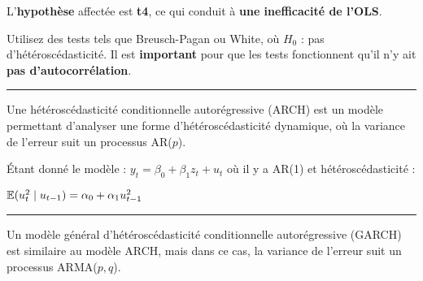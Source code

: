   \begin{f}

L'\textbf{hypothèse} affectée est \textbf{t4}, ce qui conduit à \textbf{une inefficacité de l'OLS}.

Utilisez des tests tels que Breusch-Pagan ou White, où \(H_{0}\) : pas d'hétéroscédasticité. Il est \textbf{important} pour que les tests fonctionnent qu'il n'y ait \textbf{pas d'autocorrélation}.

\end{f}  \hrule  
\begin{f}[ARCH]

Une hétéroscédasticité conditionnelle autorégressive (ARCH) est un modèle permettant d'analyser une forme d'hétéroscédasticité dynamique, où la variance de l'erreur suit un processus AR(\(p\)).

Étant donné le modèle : \(y_{t} = \beta_{0} + \beta_{1} z_{t} + u_{t}\) où il y a AR(1) et hétéroscédasticité :

\begin{center}
	\(\mathbb{E}(u^{2}_{t} \mid u_{t - 1}) = \alpha_{0} + \alpha_{1} u^{2}_{t - 1}\)
\end{center}

\end{f}  \hrule 
 \begin{f}[GARCH]

Un modèle général d'hétéroscédasticité conditionnelle autorégressive (GARCH) est similaire au modèle ARCH, mais dans ce cas, la variance de l'erreur suit un processus ARMA(\(p, q\)).
\end{f}